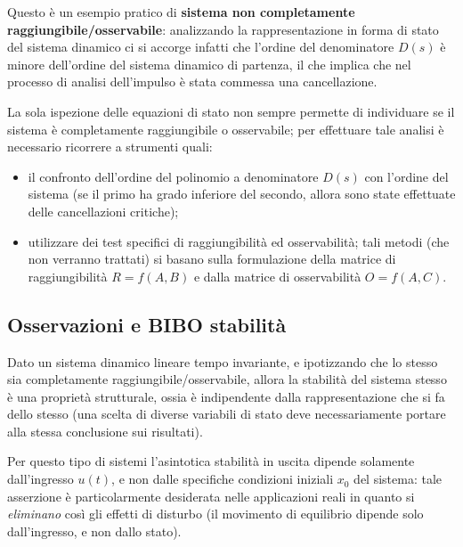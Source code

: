 		
		Questo è un esempio pratico di \textbf{sistema non completamente raggiungibile/osservabile}: analizzando la rappresentazione in forma di stato del sistema dinamico ci si accorge infatti che l'ordine del denominatore $D(s)$ è minore dell'ordine del sistema dinamico di partenza, il che implica che nel processo di analisi dell'impulso è stata commessa una cancellazione.
		
		\vspace{3mm}
		
		La sola ispezione delle equazioni di stato non sempre permette di individuare se il sistema è completamente raggiungibile o osservabile; per effettuare tale analisi è necessario ricorrere a strumenti quali:
		\begin{itemize}
			\item il confronto dell'ordine del polinomio a denominatore $D(s)$ con l'ordine del sistema (se il primo ha grado inferiore del secondo, allora sono state effettuate delle cancellazioni critiche);
			\item utilizzare dei test specifici di raggiungibilità ed osservabilità; tali metodi (che non verranno trattati) si basano sulla formulazione della matrice di raggiungibilità $R = f(A,B)$ e dalla matrice di osservabilità $O = f(A,C)$.
		\end{itemize}
		
		
	\subsection{Osservazioni e BIBO stabilità}
		Dato un sistema dinamico lineare tempo invariante, e ipotizzando che lo stesso sia completamente raggiungibile/osservabile, allora la stabilità del sistema stesso è una proprietà strutturale, ossia è indipendente dalla rappresentazione che si fa dello stesso (una scelta di diverse variabili di stato deve necessariamente portare alla stessa conclusione sui risultati).
		
		Per questo tipo di sistemi l'asintotica stabilità in uscita dipende solamente dall'ingresso $u(t)$, e non dalle specifiche condizioni iniziali $x_0$ del sistema: tale asserzione è particolarmente desiderata nelle applicazioni reali in quanto si \textit{eliminano} così gli effetti di disturbo (il movimento di equilibrio dipende solo dall'ingresso, e non dallo stato).
		
